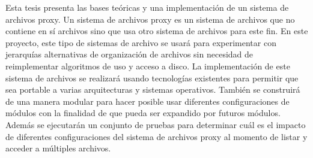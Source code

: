 


\begin{summary}        %

Esta tesis presenta las bases teóricas y una implementación de un sistema de archivos proxy. Un sistema de archivos proxy es un sistema de archivos que no contiene en sí archivos sino que usa otro sistema de archivos para este fin. En este proyecto, este tipo de sistemas de archivo se usará para experimentar con jerarquías alternativas de organización de archivos sin necesidad de reimplementar algoritmos de uso y acceso a disco. La implementación de este sistema de archivos se realizará usando tecnologías existentes para permitir que sea portable a varias arquitecturas y sistemas operativos. También se construirá de una manera modular para hacer posible usar diferentes configuraciones de módulos con la finalidad de que pueda ser expandido por futuros módulos. Además se ejecutarán un conjunto de pruebas para determinar cuál es el impacto de diferentes configuraciones del sistema de archivos proxy al momento de listar y acceder a múltiples archivos.

\end{summary}




